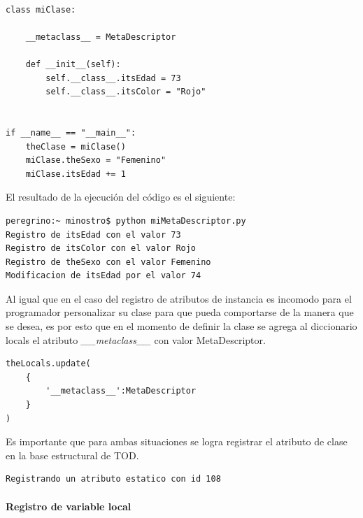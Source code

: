 \documentclass[12pt,legalpaper]{report}
\begin{document}
\begin{itemize}
\begin{singlespace}
\begin{lstlisting}[style=Python]
        
class miClase:
    
    __metaclass__ = MetaDescriptor
    
    def __init__(self):
        self.__class__.itsEdad = 73
        self.__class__.itsColor = "Rojo"
    

if __name__ == "__main__":
    theClase = miClase()
    miClase.theSexo = "Femenino"
    miClase.itsEdad += 1
\end{lstlisting}

El resultado de la ejecución del código es el siguiente:

\begin{lstlisting}[style=consola,numbers=none]
peregrino:~ minostro$ python miMetaDescriptor.py
Registro de itsEdad con el valor 73
Registro de itsColor con el valor Rojo
Registro de theSexo con el valor Femenino
Modificacion de itsEdad por el valor 74
\end{lstlisting}

\end{singlespace}

Al igual que en el caso del registro de atributos de instancia es incomodo para el programador personalizar su clase para que pueda comportarse de la manera que se desea, es por esto que en el momento de definir la clase se agrega al diccionario locals el atributo \textit{\_\_metaclass\_\_} con valor MetaDescriptor.

\begin{singlespace}
\begin{lstlisting}[style=consola,numbers=none]
theLocals.update(
    {
        '__metaclass__':MetaDescriptor
    }
)
\end{lstlisting}
\end{singlespace}
\end{itemize}
Es importante que para ambas situaciones se logra registrar el atributo de clase en la base estructural de TOD.

\begin{singlespace}
\begin{lstlisting}[style=consola,numbers=none]
Registrando un atributo estatico con id 108
\end{lstlisting}
\end{singlespace}


				\paragraph{Registro de variable local\label{registerLocal}}
				
\end{document}
